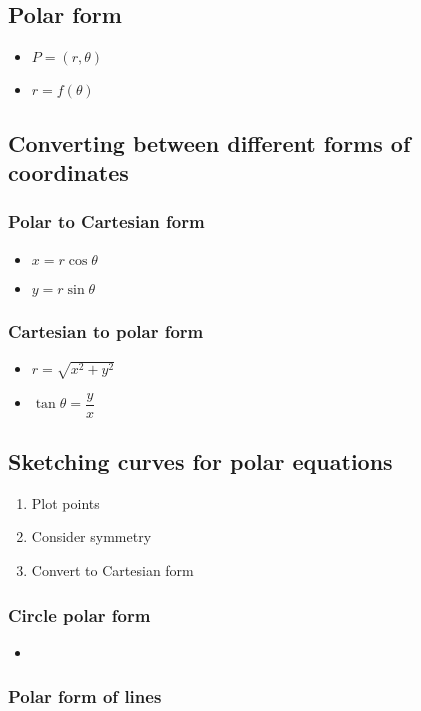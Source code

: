 \subsection{Polar form}
\begin{itemize}
	\item $P=(r,\theta)$
	\item $r=f(\theta)$
\end{itemize}

\subsection{Converting between different forms of coordinates}
\subsubsection{Polar to Cartesian form}
\begin{itemize}
	\item $x=r\cos\theta$
	\item $y=r\sin\theta$
\end{itemize}
\subsubsection{Cartesian to polar form}
\begin{itemize}
	\item $r=\sqrt{x^2+y^2}$
	\item $\tan\theta=\dfrac{y}{x}$
\end{itemize}


\subsection{Sketching curves for polar equations}
\begin{enumerate}
	\item Plot points
	\item Consider symmetry
	\item Convert to Cartesian form
\end{enumerate}
\subsubsection{Circle polar form}
\begin{itemize}
	\item 
\end{itemize}
\subsubsection{Polar form of lines}
